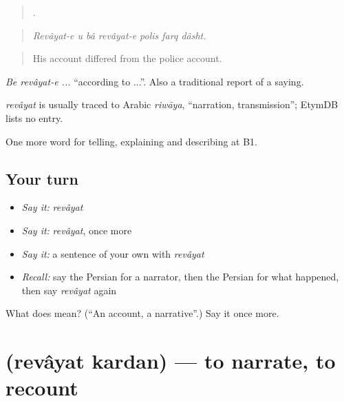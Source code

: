 \begin{quote}
      .
\end{quote}

\begin{quote}
\emph{Revâyat-e u bâ revâyat-e polis farq dâsht.}
\end{quote}

\begin{quote}
His account differed from the police account.
\end{quote}

\emph{Be revâyat-e ...} \textquotedblleft{}according to ...\textquotedblright{}. Also a traditional report of a saying.

\begin{cousinweb}
\emph{revâyat} is usually traced to Arabic \emph{riwāya}, \textquotedblleft{}narration, transmission\textquotedblright{}; EtymDB lists no entry.
\end{cousinweb}

\begin{grammarlens}[title={What you've built}]
One more word for telling, explaining and describing at B1.
\end{grammarlens}

\subsection*{Your turn}
\begin{itemize}
\raggedright
  \item \emph{Say it:} \emph{revâyat}
  \item \emph{Say it:} \emph{revâyat}, once more
  \item \emph{Say it:} a sentence of your own with \emph{revâyat}
  \item \emph{Recall:} say the Persian for a narrator, then the Persian for what happened, then say \emph{revâyat} again
\end{itemize}

\begin{tcolorbox}[breakable,colback=teal!4,colframe=teal!35!black,title={Before you move on}]
What does  mean? (\textquotedblleft{}An account, a narrative\textquotedblright{}.) Say it once more.
\end{tcolorbox}
\section[\texorpdfstring{\fa{روایت} \fa{کردن} (revâyat kardan)}{روایت کردن (revâyat kardan)}]{  (revâyat kardan) — to narrate, to recount}

